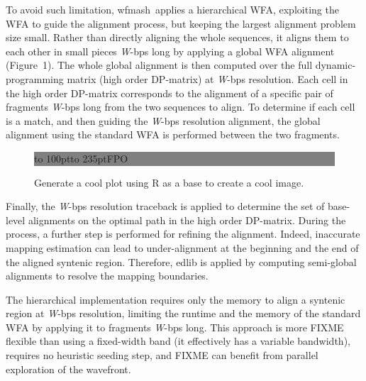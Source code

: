 \documentclass{bioinfo}
\newcommand{\wfmash}{wfmash}
\begin{document}
    To avoid such limitation, \wfmash\ applies a hierarchical WFA, exploiting the WFA to guide the alignment
    process, but keeping the largest alignment problem size small. Rather than directly aligning the whole
    sequences, it aligns them to each other in small pieces \textit{W}-bps long by applying a global WFA alignment
    (Figure~1\vphantom{\ref{fig:1}}). The whole global alignment is then computed over the full
    dynamic-programming matrix (high order DP-matrix) at \textit{W}-bps resolution.
    Each cell in the high order DP-matrix corresponds to the alignment of a specific pair of fragments
    \textit{W}-bps long from the two sequences to align. To determine if each cell is a match, and then guiding the
    \textit{W}-bps resolution alignment, the global alignment using the standard WFA is performed between the
    two fragments.


    \begin{figure}[!tpb]%
        \fboxsep=0pt\colorbox{gray}{
            \begin{minipage}[t]{235pt}
                \vbox to 100pt{\vfill\hbox to
                235pt{\hfill\fontsize{24pt}{24pt}\selectfont FPO\hfill}\vfill}
            \end{minipage}}
        \caption{Generate a cool plot using R as a base to create a cool image.}\label{fig:1}
    \end{figure}


    Finally, the \textit{W}-bps resolution traceback is applied to determine the set of base-level alignments
    on the optimal path in the high order DP-matrix. During the process, a further step is performed for
    refining the alignment. Indeed, inaccurate mapping estimation can lead to under-alignment at the beginning
    and the end of the aligned syntenic region. Therefore, edlib is applied by computing semi-global alignments
    to resolve the mapping boundaries.

    The hierarchical implementation requires only the memory to align a syntenic region at \textit{W}-bps resolution,
    limiting the runtime and the memory of the standard WFA by applying it to fragments \textit{W}-bps long.
    This approach is more FIXME flexible than using a fixed-width band (it effectively has a variable bandwidth), requires
    no heuristic seeding step, and FIXME can benefit from parallel exploration of the wavefront.
\end{document}
